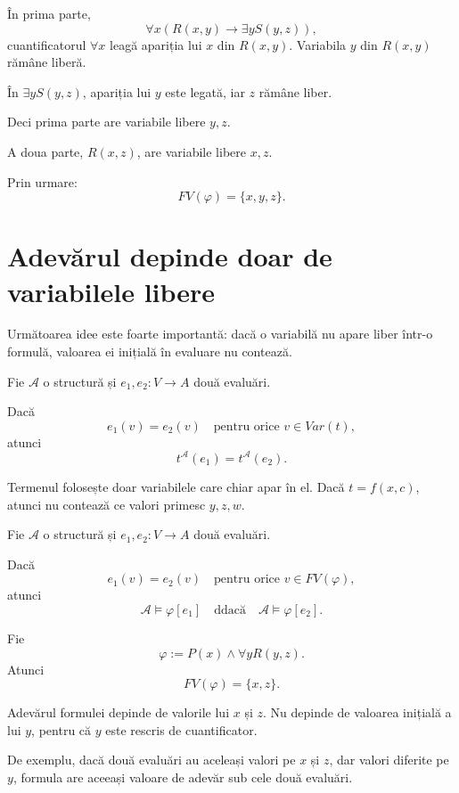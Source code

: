 \begin{solutie}
	În prima parte,
	\[
		\forall x(R(x,y) \to \exists y S(y,z)),
	\]
	cuantificatorul \( \forall x \) leagă apariția lui \(x\) din \(R(x,y)\). Variabila \(y\) din \(R(x,y)\) rămâne liberă.

	În \( \exists y S(y,z) \), apariția lui \(y\) este legată, iar \(z\) rămâne liber.

	Deci prima parte are variabile libere \(y,z\).

	A doua parte, \(R(x,z)\), are variabile libere \(x,z\).

	Prin urmare:
	\[
		FV(\varphi)=\{x,y,z\}.
	\]
\end{solutie}

\section{Adevărul depinde doar de variabilele libere}

Următoarea idee este foarte importantă: dacă o variabilă nu apare liber într-o formulă, valoarea ei inițială în evaluare nu contează.

\begin{prop}
	Fie \( \mathcal{A} \) o structură și \(e_1,e_2 : V \to A\) două evaluări.

	Dacă
	\[
		e_1(v)=e_2(v)
		\quad \text{pentru orice } v \in Var(t),
	\]
	atunci
	\[
		t^\mathcal{A}(e_1)=t^\mathcal{A}(e_2).
	\]
\end{prop}

Termenul folosește doar variabilele care chiar apar în el. Dacă \(t=f(x,c)\), atunci nu contează ce valori primesc \(y,z,w\).

\begin{prop}
	Fie \( \mathcal{A} \) o structură și \(e_1,e_2 : V \to A\) două evaluări.

	Dacă
	\[
		e_1(v)=e_2(v)
		\quad \text{pentru orice } v \in FV(\varphi),
	\]
	atunci
	\[
		\mathcal{A} \models \varphi[e_1]
		\quad \text{ddacă} \quad
		\mathcal{A} \models \varphi[e_2].
	\]
\end{prop}

\begin{eg}
	Fie
	\[
		\varphi := P(x) \land \forall y R(y,z).
	\]
	Atunci
	\[
		FV(\varphi)=\{x,z\}.
	\]

	Adevărul formulei depinde de valorile lui \(x\) și \(z\). Nu depinde de valoarea inițială a lui \(y\), pentru că \(y\) este rescris de cuantificator.

	De exemplu, dacă două evaluări au aceleași valori pe \(x\) și \(z\), dar valori diferite pe \(y\), formula are aceeași valoare de adevăr sub cele două evaluări.
\end{eg}

